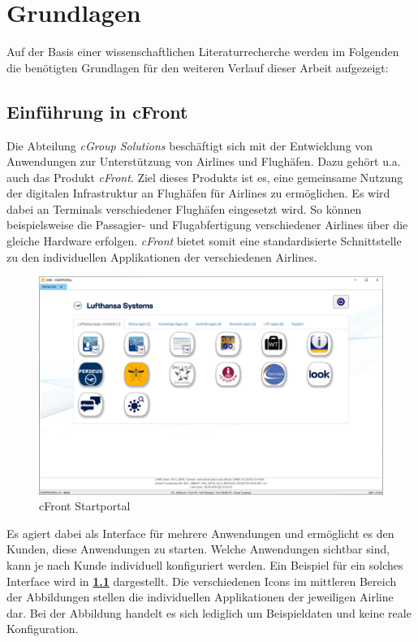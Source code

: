 
\chapter{Grundlagen}
Auf der Basis einer wissenschaftlichen Literaturrecherche werden im Folgenden die benötigten Grundlagen für den weiteren Verlauf dieser Arbeit aufgezeigt:

\section{Einführung in cFront} \label{cFront-exp}
Die Abteilung \textit{cGroup Solutions} beschäftigt sich mit der Entwicklung von Anwendungen zur Unterstützung von Airlines und Flughäfen. Dazu gehört u.a. auch das Produkt \textit{cFront}. Ziel dieses Produkts ist es, eine gemeinsame Nutzung der digitalen Infrastruktur an Flughäfen für Airlines zu ermöglichen.
Es wird dabei an Terminals verschiedener Flughäfen eingesetzt wird. So können beispielsweise die Passagier- und Flugabfertigung verschiedener Airlines über die gleiche Hardware erfolgen. \textit{cFront} bietet somit eine standardisierte Schnittstelle zu den individuellen Applikationen der verschiedenen Airlines.

\begin{figure}[h]
	\centering 
	\includegraphics[width=1\textwidth]{img/abbildungen/MicrosoftTeams-image (3).png}
	\captionsetup{format=hang}
	\caption{cFront Startportal} \label{cFront}
\end{figure}

Es agiert dabei als Interface für mehrere Anwendungen und ermöglicht es den Kunden, diese Anwendungen zu starten. Welche Anwendungen sichtbar sind, kann je nach Kunde individuell konfiguriert werden. Ein Beispiel für ein solches Interface wird in \textbf{\ref{cFront}} dargestellt.
Die verschiedenen Icons im mittleren Bereich der Abbildungen stellen die individuellen Applikationen der jeweiligen Airline dar. Bei der Abbildung handelt es sich lediglich um Beispieldaten und keine reale Konfiguration.


